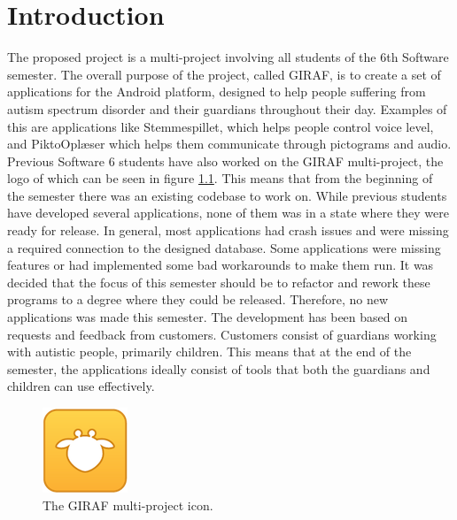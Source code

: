 \chapter{Introduction}\label{chap:introduction}
The proposed project is a multi-project involving all students of the 6th Software semester. The overall purpose of the project, called GIRAF, is to create a set of applications for the Android platform, designed to help people suffering from autism spectrum disorder and their guardians throughout their day. Examples of this are applications like Stemmespillet, which helps people control voice level, and PiktoOplæser which helps them communicate through pictograms and audio.
Previous Software 6 students have also worked on the GIRAF multi-project, the logo of which can be seen in figure \ref{fig:GIRAFlogo}. This means that from the beginning of the semester there was an existing codebase to work on. While previous students have developed several applications, none of them was in a state where they were ready for release. In general, most applications had crash issues and were missing a required connection to the designed database. Some applications were missing features or had implemented some bad workarounds to make them run. It was decided that the focus of this semester should be to refactor and rework these programs to a degree where they could be released. Therefore, no new applications was made this semester.
The development has been based on requests and feedback from customers. Customers consist of guardians working with autistic people, primarily children. This means that at the end of the semester, the applications ideally consist of tools that both the guardians and children can use effectively.

\begin{figure}[H]
	\centering
	\includegraphics[scale=1]{Pics/ic_giraf.png}
	\caption{The GIRAF multi-project icon.}
	\label{fig:GIRAFlogo}
\end{figure}

